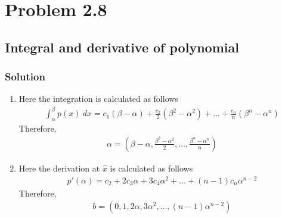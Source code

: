 \documentclass{article}
\begin{document}
\section*{Problem 2.8}
\subsection*{Integral and derivative of polynomial}
\subsubsection*{Solution}

\begin{enumerate}[label=(\alph*)]
\item Here the integration is calculated as follows
\begin{align*}
    \int_{\alpha}^{\beta} p(x)\ dx = c_1(\beta - \alpha) + \frac{c_2}{2}(\beta^2 - \alpha^2) + \ldots +  \frac{c_n}{n}(\beta^n - \alpha^n)
\end{align*}
Therefore,
\begin{align*}
    \alpha = (\beta - \alpha , \frac{\beta^2 - \alpha^2}{2} , \ldots ,  \frac{\beta^n - \alpha^n}{n})
\end{align*}
\item Here the derivation at $\hat x$ is calculated as follows
\begin{align*}
p'(\alpha) = c_2 + 2c_3\alpha + 3c_4\alpha^{2} +  \ldots +  (n-1)c_n\alpha^{n-2}
\end{align*}
Therefore,
\begin{align*}
b = (0,1,2\alpha,3\alpha^{2} ,  \ldots ,  (n-1)\alpha^{n-2})
\end{align*}
\end{enumerate}
\end{document}
